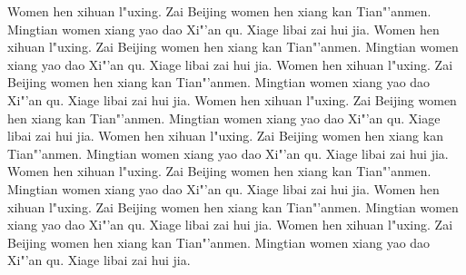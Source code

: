 \documentclass[12pt,b5paper]{article}
\begin{document}


Women hen xihuan l"uxing.  Zai Beijing women hen xiang kan Tian"'anmen.
Mingtian women xiang yao dao Xi"'an qu.  Xiage libai zai hui jia.
Women hen xihuan l"uxing.  Zai Beijing women hen xiang kan Tian"'anmen.
Mingtian women xiang yao dao Xi"'an qu.  Xiage libai zai hui jia.
Women hen xihuan l"uxing.  Zai Beijing women hen xiang kan Tian"'anmen.
Mingtian women xiang yao dao Xi"'an qu.  Xiage libai zai hui jia.
Women hen xihuan l"uxing.  Zai Beijing women hen xiang kan Tian"'anmen.
Mingtian women xiang yao dao Xi"'an qu.  Xiage libai zai hui jia.
Women hen xihuan l"uxing.  Zai Beijing women hen xiang kan Tian"'anmen.
Mingtian women xiang yao dao Xi"'an qu.  Xiage libai zai hui jia.
Women hen xihuan l"uxing.  Zai Beijing women hen xiang kan Tian"'anmen.
Mingtian women xiang yao dao Xi"'an qu.  Xiage libai zai hui jia.
Women hen xihuan l"uxing.  Zai Beijing women hen xiang kan Tian"'anmen.
Mingtian women xiang yao dao Xi"'an qu.  Xiage libai zai hui jia.
Women hen xihuan l"uxing.  Zai Beijing women hen xiang kan Tian"'anmen.
Mingtian women xiang yao dao Xi"'an qu.  Xiage libai zai hui jia.
\end{document}
